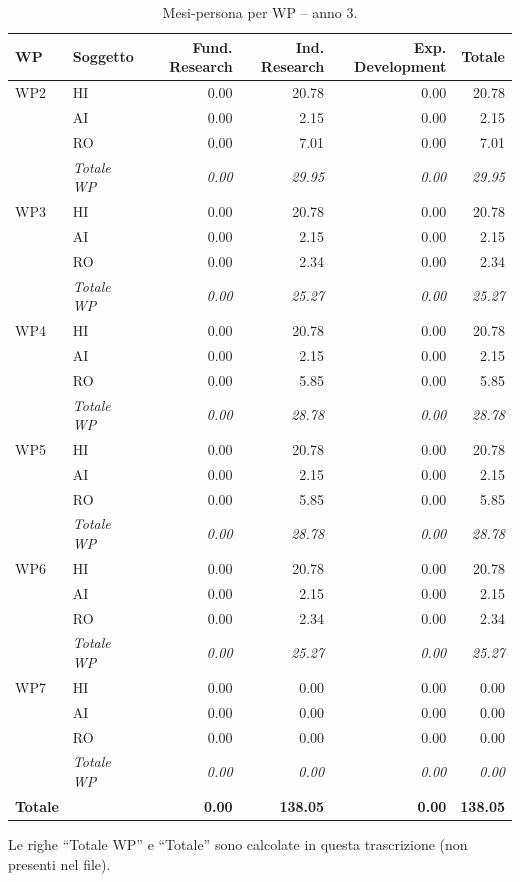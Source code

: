 \documentclass{plan4ari_report}
\begin{document}
\begin{table}[H]\centering\small\caption{Mesi-persona per WP -- anno 3.}\label{tab:wp-w-y3}
\begin{tabular}{llrrrr}\toprule\textbf{WP} & \textbf{Soggetto} & \textbf{Fund. Research} & \textbf{Ind. Research} & \textbf{Exp. Development} & \textbf{Totale} \\\midrule
WP2 & HI & 0.00 & 20.78 & 0.00 & 20.78 \\
 & AI & 0.00 & 2.15 & 0.00 & 2.15 \\
 & RO & 0.00 & 7.01 & 0.00 & 7.01 \\
 & \textit{Totale WP} & \textit{0.00} & \textit{29.95} & \textit{0.00} & \textit{29.95} \\\midrule
WP3 & HI & 0.00 & 20.78 & 0.00 & 20.78 \\
 & AI & 0.00 & 2.15 & 0.00 & 2.15 \\
 & RO & 0.00 & 2.34 & 0.00 & 2.34 \\
 & \textit{Totale WP} & \textit{0.00} & \textit{25.27} & \textit{0.00} & \textit{25.27} \\\midrule
WP4 & HI & 0.00 & 20.78 & 0.00 & 20.78 \\
 & AI & 0.00 & 2.15 & 0.00 & 2.15 \\
 & RO & 0.00 & 5.85 & 0.00 & 5.85 \\
 & \textit{Totale WP} & \textit{0.00} & \textit{28.78} & \textit{0.00} & \textit{28.78} \\\midrule
WP5 & HI & 0.00 & 20.78 & 0.00 & 20.78 \\
 & AI & 0.00 & 2.15 & 0.00 & 2.15 \\
 & RO & 0.00 & 5.85 & 0.00 & 5.85 \\
 & \textit{Totale WP} & \textit{0.00} & \textit{28.78} & \textit{0.00} & \textit{28.78} \\\midrule
WP6 & HI & 0.00 & 20.78 & 0.00 & 20.78 \\
 & AI & 0.00 & 2.15 & 0.00 & 2.15 \\
 & RO & 0.00 & 2.34 & 0.00 & 2.34 \\
 & \textit{Totale WP} & \textit{0.00} & \textit{25.27} & \textit{0.00} & \textit{25.27} \\\midrule
WP7 & HI & 0.00 & 0.00 & 0.00 & 0.00 \\
 & AI & 0.00 & 0.00 & 0.00 & 0.00 \\
 & RO & 0.00 & 0.00 & 0.00 & 0.00 \\
 & \textit{Totale WP} & \textit{0.00} & \textit{0.00} & \textit{0.00} & \textit{0.00} \\
\midrule\textbf{Totale} & & \textbf{0.00} & \textbf{138.05} & \textbf{0.00} & \textbf{138.05} \\
\bottomrule\end{tabular}
\par\smallskip\footnotesize Le righe ``Totale WP'' e ``Totale'' sono calcolate in questa trascrizione (non presenti nel file).
\end{table}
\end{document}
